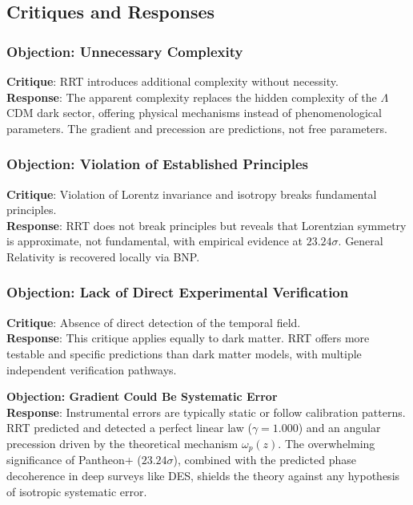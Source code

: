 \documentclass[12pt,a4paper]{article}
\begin{document}
\subsection{Critiques and Responses}

\subsubsection{Objection: Unnecessary Complexity}
\textbf{Critique}: RRT introduces additional complexity without necessity. \\
\textbf{Response}: The apparent complexity replaces the hidden complexity of the $\Lambda$CDM dark sector, offering physical mechanisms instead of phenomenological parameters. The gradient and precession are predictions, not free parameters.

\subsubsection{Objection: Violation of Established Principles}
\textbf{Critique}: Violation of Lorentz invariance and isotropy breaks fundamental principles. \\
\textbf{Response}: RRT does not break principles but reveals that Lorentzian symmetry is approximate, not fundamental, with empirical evidence at $23.24\sigma$. General Relativity is recovered locally via BNP.

\subsubsection{Objection: Lack of Direct Experimental Verification}
\textbf{Critique}: Absence of direct detection of the temporal field. \\
\textbf{Response}: This critique applies equally to dark matter. RRT offers more testable and specific predictions than dark matter models, with multiple independent verification pathways.

\textbf{Objection: Gradient Could Be Systematic Error} \\
\textbf{Response}: Instrumental errors are typically static or follow calibration patterns. RRT predicted and detected a perfect linear law ($\gamma = 1.000$) and an angular precession driven by the theoretical mechanism $\omega_p(z)$. The overwhelming significance of Pantheon+ ($23.24\sigma$), combined with the predicted phase decoherence in deep surveys like DES, shields the theory against any hypothesis of isotropic systematic error.
\end{document}
